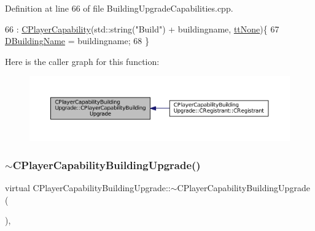 Definition at line 66 of file Building\+Upgrade\+Capabilities.\+cpp.


\begin{DoxyCode}
66                                                                                                 : 
      \hyperlink{classCPlayerCapability_a303de62aba5d3f65d9a8e013c64a96c1}{CPlayerCapability}(std::string(\textcolor{stringliteral}{"Build"}) + buildingname, \hyperlink{classCPlayerCapability_a9d3450ed1532fd536bd6cbb1e2eef02fac78f0e806a6b0ead030d63c27c9ce929}{ttNone})\{
67     \hyperlink{classCPlayerCapabilityBuildingUpgrade_a244e767a3e669441cfb03c13bf703e64}{DBuildingName} = buildingname;
68 \}
\end{DoxyCode}
Here is the caller graph for this function\+:\nopagebreak
\begin{figure}[H]
\begin{center}
\leavevmode
\includegraphics[width=350pt]{classCPlayerCapabilityBuildingUpgrade_a80ccec4b17a9e43914bec537dcbe1b9e_icgraph}
\end{center}
\end{figure}
\hypertarget{classCPlayerCapabilityBuildingUpgrade_abcef586e377c86c3da3cd698dca268ef}{}\label{classCPlayerCapabilityBuildingUpgrade_abcef586e377c86c3da3cd698dca268ef} 
\subsubsection{\texorpdfstring{$\sim$\+C\+Player\+Capability\+Building\+Upgrade()}{~CPlayerCapabilityBuildingUpgrade()}}
{\footnotesize\ttfamily virtual C\+Player\+Capability\+Building\+Upgrade\+::$\sim$\+C\+Player\+Capability\+Building\+Upgrade (\begin{DoxyParamCaption}{ }\end{DoxyParamCaption})\hspace{0.3cm}{\ttfamily [inline]}, {\ttfamily [virtual]}}



